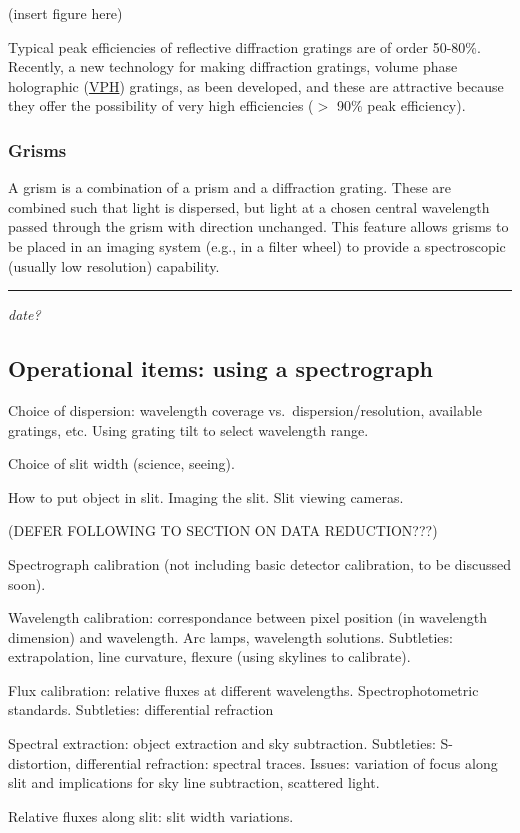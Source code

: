 \documentclass[12pt]{article}
\newcommand{\mydate}[1]{
    \begin{flushright}
        \rule{\textwidth}{0.4pt} %
        \footnotesize\hfill\textit{#1}
    \end{flushright}}
\begin{document}
(insert figure here)

Typical peak efficiencies of reflective diffraction gratings are of order
50-80\%. Recently, a new technology for making diffraction gratings, volume
phase holographic (\href{http://www.kosi.com/Holographic_Gratings/vph_ht_overview.php}
{VPH}) gratings, as been developed, and these are attractive because they offer
the possibility of very high efficiencies ($>$ 90\% peak efficiency).

\subsubsection{Grisms}
A grism is a combination of a prism and a diffraction grating. These
are combined such that light is dispersed, but light at a chosen
central wavelength passed through the grism with direction unchanged.
This feature allows grisms to be placed in an imaging system (e.g., in
a filter wheel) to provide a spectroscopic (usually low resolution)
capability.

\mydate{date?}
\subsection{Operational items: using a spectrograph}
Choice of dispersion: wavelength coverage vs.\ dispersion/resolution,
available gratings, etc. Using grating tilt to select wavelength
range.

Choice of slit width (science, seeing).

How to put object in slit. Imaging the slit. Slit viewing cameras.

(DEFER FOLLOWING TO SECTION ON DATA REDUCTION???)

Spectrograph calibration (not including basic detector calibration, to
be discussed soon).

Wavelength calibration: correspondance between pixel position (in
wavelength dimension) and wavelength. Arc lamps, wavelength solutions.
Subtleties: extrapolation, line curvature, flexure (using skylines to
calibrate).

Flux calibration: relative fluxes at different wavelengths.
Spectrophotometric standards. Subtleties: differential refraction

Spectral extraction: object extraction and sky subtraction.
Subtleties: S-distortion, differential refraction: spectral traces.
Issues: variation of focus along slit and implications for sky line
subtraction, scattered light.

Relative fluxes along slit: slit width variations.
\end{document}

